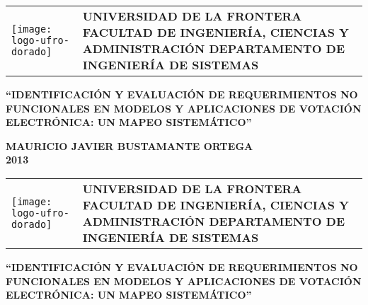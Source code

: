 
\leftskip=0cm 
\rightskip=0cm

\begin{center}
\begin{tabularx}{\textwidth}{p{3cm} >{\centering\arraybackslash}X}
	\vspace{0pt} 
	\texttt{[image: logo-ufro-dorado]}
   	& 
   	\vspace{10pt} \textbf{ \uppercase{universidad de la frontera \linebreak facultad de ingeniería, ciencias y administración \linebreak departamento de ingeniería de sistemas}}
	
\end{tabularx}
\end{center}

\null
\vfill

\begin{center}
	\textbf{ \uppercase{
	``Identificación y evaluación de requerimientos no %
	funcionales en modelos y aplicaciones de %
	votación electrónica: un mapeo sistemático''
	} }
\end{center}

\null
\vfill

\begin{center}
	\textbf{ \uppercase{
	Mauricio Javier Bustamante Ortega \\
	2013
	} }
\end{center}

\clearpage
\newpage\null\thispagestyle{empty}\newpage

\begin{center}
\begin{tabularx}{\textwidth}{p{3cm} >{\centering\arraybackslash}X}
	\vspace{0pt} 
	\texttt{[image: logo-ufro-dorado]}
   	& 
   	\vspace{10pt} \textbf{ \uppercase{universidad de la frontera \linebreak facultad de ingeniería, ciencias y administración \linebreak departamento de ingeniería de sistemas}}
	
\end{tabularx}
\end{center}

\null
\vfill

\begin{center}
	\textbf{ \uppercase{
	``Identificación y evaluación %
	de requerimientos no %
	funcionales en modelos y aplicaciones de %
	votación electrónica: un mapeo sistemático''
	} }
\end{center}

